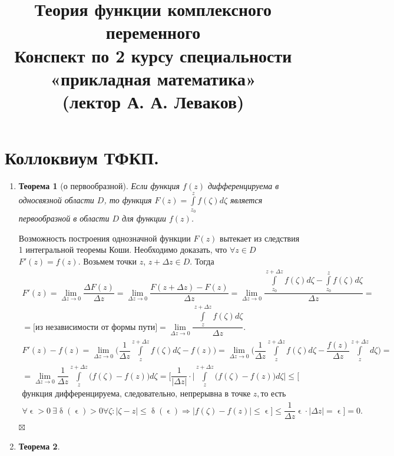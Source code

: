 \documentclass[a4paper, 12pt]{article}
\title{\vspace{6.5cm}\textbf{\Huge{Теория функции комплексного переменного}}\\Конспект по 2 курсу 
	специальности «прикладная математика»\\(лектор А. А. Леваков)}
\date{}
\newenvironment{Proof} %
{\par\noindent{$\blacklozenge$}} %
{\hfill$\scriptstyle\boxtimes$}
\renewcommand{\leq}{\leqslant}
\renewcommand{\delta}{\updelta}
\renewcommand{\epsilon}{\upvarepsilon}
\newcommand{\limdef}{\forall \epsilon >0\ \exists \delta (\epsilon) > 0}
\newtheorem*{theorem}{Теорема}
\begin{document}
	\section*{Коллоквиум ТФКП.}
	\begin{enumerate}
		\item \begin{theorem}
			[о первообразной] Если функция $f(z)$ дифференцируема в односвязной области $D$, то функция $F(z) = \int\limits_{z_0}^z f(\zeta)d\zeta$ является первообразной в области $D$ для функции $f(z)$.
		\end{theorem}\begin{Proof}
			Возможность построения однозначной функции $F(z)$ вытекает из  следствия 1 интегральной теоремы Коши. Необходимо доказать, что $\forall z \in D$ $F'(z) = f(z)$. Возьмем точки $z$, $z + \Delta z \in D$. Тогда \begin{multline*}
				F'(z) = \lim\limits_{\Delta z \to 0} \dfrac{\Delta F(z)}{\Delta z} = \lim\limits_{\Delta z \to 0} \dfrac{F(z + \Delta z) - F(z)}{\Delta z} = \lim\limits_{\Delta z \to 0} \dfrac{\int\limits_{z_0}^{z + \Delta z}f(\zeta)d\zeta - \int\limits_{z_0}^{z}f(\zeta)d\zeta}{\Delta z}=\\=\text{[из независимости от формы пути]} = \lim\limits_{\Delta z \to 0} \dfrac{\int\limits_{z}^{z + \Delta z}f(\zeta)d\zeta}{\Delta z}.
			\end{multline*}
			\begin{multline*}
				F'(z) - f(z) = \lim\limits_{\Delta z \to 0}\Big(\dfrac{1}{\Delta z}\int\limits_{z}^{z + \Delta z}f(\zeta)d\zeta - f(z) \Big) = \lim\limits_{\Delta z \to 0}\Big(\dfrac{1}{\Delta z}\int\limits_{z}^{z + \Delta z}f(\zeta)d\zeta - \dfrac{f(z)}{\Delta z} \int\limits_{z}^{z + \Delta z}d\zeta \Big) = \\ =\lim\limits_{\Delta z \to 0} \dfrac{1}{\Delta z} \int\limits_{z}^{z + \Delta z} \Big( f(\zeta) - f(z)\Big)d\zeta = \Big[ \dfrac{1}{|\Delta z|}\cdot \Big|\int\limits_{z}^{z + \Delta z} \Big( f(\zeta) - f(z)\Big)d\zeta\Big|\leq \big[\\ \text{функция дифференцируема, следовательно, непрерывна в точке } z, \text{то есть} \\ \limdef \forall\zeta : |\zeta - z |\leq\delta (\epsilon) \Rightarrow |f(\zeta) - f(z)|\leq \epsilon \big] \leq \dfrac{1}{\Delta z}\epsilon\cdot |\Delta z| = \epsilon\Big] = 0.
			\end{multline*}
		\end{Proof}
	\item \begin{theorem}

\end{theorem}
\end{enumerate}
\end{document}
